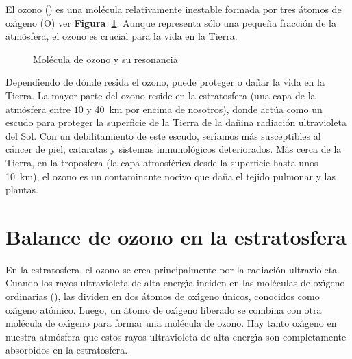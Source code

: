 El ozono () es una mol\'ecula relativamente inestable formada por tres \'atomos de ox\'{\i}geno (O) ver \textbf{Figura~\ref{reso3}}. Aunque representa s\'olo una peque\~na fracci\'on de la atm\'osfera, el ozono es crucial para la vida en la Tierra.
\begin{figure}[htbp]
\begin{center}
\caption{Mol\'ecula de ozono y su resonancia}
\label{reso3}
\end{center}
\end{figure}


Dependiendo de d\'onde resida el ozono, puede proteger o da\~nar la vida en la Tierra. La mayor parte del ozono reside en la estratosfera (una capa de la atm\'osfera entre $10$ y \SI{40}{\kilo\metre}  por encima de nosotros), donde act\'ua como un escudo para proteger la superficie de la Tierra de la da\~nina radiaci\'on ultravioleta del Sol. Con un debilitamiento de este escudo, ser\'{\i}amos m\'as susceptibles al c\'ancer de piel, cataratas y sistemas inmunol\'ogicos deteriorados. M\'as cerca de la Tierra, en la troposfera (la capa atmosf\'erica desde la superficie hasta unos \SI{10}{\kilo\metre}), el ozono es un contaminante nocivo que da\~na el tejido pulmonar y las plantas.

\section{Balance de ozono en la estratosfera}\label{oestra}

En la estratosfera, el ozono se crea principalmente por la radiaci\'on ultravioleta. Cuando los rayos ultravioleta de alta energ\'{\i}a inciden en las mol\'eculas de ox\'{\i}geno ordinarias (), las dividen en dos \'atomos de ox\'{\i}geno \'unicos, conocidos como ox\'{\i}geno at\'omico.
 Luego, un \'atomo de ox\'{\i}geno liberado se combina con otra mol\'ecula de ox\'{\i}geno para formar una mol\'ecula de ozono. Hay tanto ox\'{\i}geno en nuestra atm\'osfera que estos rayos ultravioleta de alta energ\'{\i}a son completamente absorbidos en la estratosfera.

